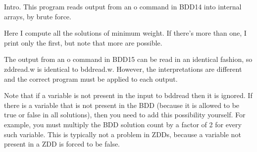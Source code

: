
\datethis

Intro. This program reads output from an {\mc o} command in  {\mc
BDD14}
into internal arrays, by brute force.

Here I compute all the solutions of minimum weight.
If there's more than one, I print only the first, but note
that more are possible.

The output from an {\mc o} command in {\mc BDD15}
can be read in an identical fashion,
so {\mc zddread.w} is identical to {\mc bddread.w}.
However, the interpretations are different
and the correct program must be applied to each output.

Note that if a variable is not present in the input to {\mc bddread}
then it is ignored.
If there is a variable that is not present in the BDD
(because it is allowed to be true or false in all solutions),
then you need to add this possibility yourself.
For example, you must multiply the BDD solution count by a factor of 2
for every such variable.
This is typically not a problem in ZDDs,
because a variable not present in a ZDD is forced to be false.

